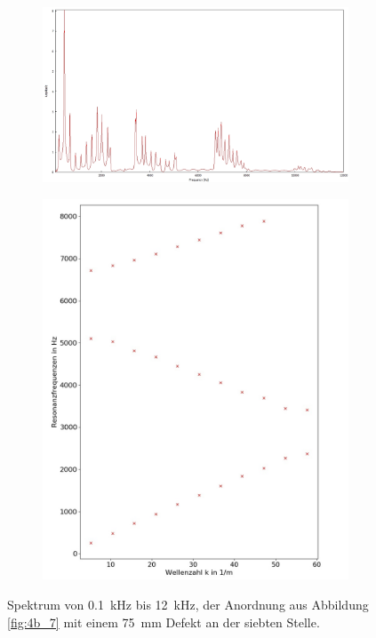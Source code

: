 \begin{figure}
\centering
\begin{subfigure}{0.65\textwidth}
\includegraphics[width=\textwidth]{content/messungen/Chapter4b/4b_7_1c.jpg}
\end{subfigure}
\begin{subfigure}{0.34\textwidth}
\includegraphics[width=\textwidth]{content/Scripts/4b_7_1c.jpg}
\end{subfigure}
\caption{Spektrum von 0.1~kHz bis 12~kHz, der Anordnung aus Abbildung \ref{fig:4b_7} mit einem 75~mm Defekt an der siebten Stelle.}
\label{fig:4b_7_1c}
\end{figure}
